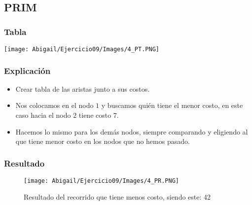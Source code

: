 \documentclass[12pt]{article}
\begin{document}
    \subsection{PRIM}
    \begin{multicols}{2}
            \subsubsection{Tabla}
                  \texttt{[image: Abigail/Ejercicio09/Images/4\_PT.PNG]}
              
        \columnbreak
        
            \subsubsection{Explicación}
                \begin{itemize}
        
                  \item[\checkmark] Crear tabla de las aristas junto a sus costos.
        
                  \item[\checkmark] Nos colocamos en el nodo $1$ y buscamos quién tiene el menor costo, en este caso hacia el nodo $2$ tiene costo $7$.
         
                  \item[\checkmark] Hacemos lo mismo para los demás nodos, siempre comparando y eligiendo al que tiene menor costo en los nodos que no hemos pasado.
        
                \end{itemize}
        \end{multicols}

      \subsubsection{Resultado}
        \begin{figure}[h!]
          \centering
          \texttt{[image: Abigail/Ejercicio09/Images/4\_PR.PNG]}
          \caption{Resultado del recorrido que tiene menos costo, siendo este: 42}
        \end{figure} 
\newpage
\end{document}
